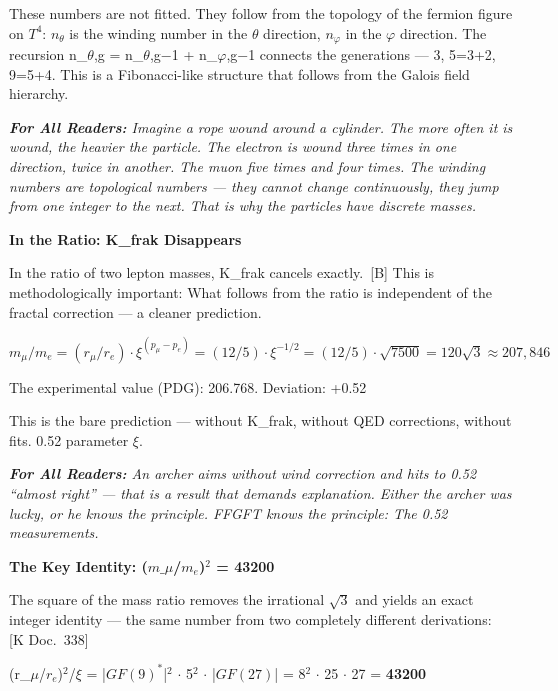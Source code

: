 \documentclass[11pt,oneside]{book}
\newcommand{\status}[1]{\penalty10000\,{\scriptsize\textcolor{gray!60}{[#1]}}}
\newenvironment{laierspur}{%
  \par\vspace{4pt}%
  \noindent\small\itshape\color{blue!60!black}%
  \textbf{For All Readers:}\enspace\ignorespaces}{%
  \par\vspace{4pt}\normalsize\normalfont\normalcolor}
\begin{document}
These numbers are not fitted. They follow from the topology of the fermion
figure on $T^4$: $n_\theta$ is the winding number in the $\theta$ direction, $n_\varphi$
in the $\varphi$ direction. The recursion n\_{$\theta$,g} = n\_{$\theta$,g$-$1} + n\_{$\varphi$,g$-$1}
connects the generations — 3, 5=3+2, 9=5+4. This is a Fibonacci-like
structure that follows from the Galois field hierarchy.

\begin{laierspur}
Imagine a rope wound around a cylinder. The more often it is wound, the
heavier the particle. The electron is wound three times in one direction,
twice in another. The muon five times and four times. The winding numbers
are topological numbers — they cannot change continuously, they jump from one
integer to the next. That is why the particles have discrete masses.
\end{laierspur}

\textbf{In the Ratio: K\_frak Disappears}

In the ratio of two lepton masses, K\_frak cancels exactly. \status{B}
This is methodologically important: What follows from the ratio is
independent of the fractal correction — a cleaner prediction.

$m_\mu/m_e = (r_\mu/r_e)\cdot\xi^{(p_\mu - p_e)} = (12/5)\cdot\xi^{-1/2} = (12/5)\cdot\sqrt{7500} = 120\sqrt{3} \approx 207{,}846$

The experimental value (PDG): 206.768. Deviation: +0.52%

This is the bare prediction — without K\_frak, without QED corrections, without
fits. 0.52%
parameter $\xi$.

\begin{laierspur}
An archer aims without wind correction and hits to 0.52%
\enquote{almost right} — that is a result that demands explanation. Either the
archer was lucky, or he knows the principle. FFGFT knows the principle: The
0.52%
measurements.
\end{laierspur}

\textbf{The Key Identity: ($m\_\mu$/$m_e$)$^2$ = 43200}

The square of the mass ratio removes the irrational $\sqrt{3}$ and yields an
exact integer identity — the same number from two completely different
derivations: \status{K Doc.~338}

(r\_$\mu$/$r_e$)$^2$/$\xi$ = |$GF(9)^*$|$^2$ $\cdot$ 5$^2$ $\cdot$ |$GF(27)$| = 8$^2$ $\cdot$ 25 $\cdot$ 27 = \textbf{43200}
\end{document}
